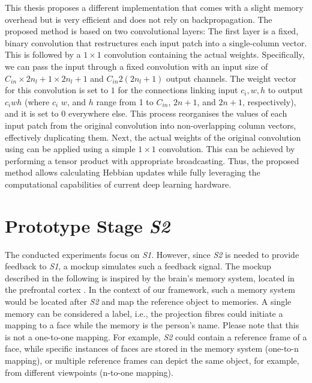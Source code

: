 This thesis proposes a different implementation that comes with a slight memory overhead but is very efficient and does not rely on backpropagation. The proposed method is based on two convolutional layers: The first layer is a fixed, binary convolution that restructures each input patch into a single-column vector. This is followed by a $1\times1$ convolution containing the actual weights. Specifically, we can pass the input through a fixed convolution with an input size of $C_{in} \times 2n_l+1 \times 2n_l+1$ and $C_{in} 2(2n_l+1)$ output channels. The weight vector for this convolution is set to $1$ for the connections linking input $c_i,w,h$ to output $c_iwh$ (where $c_i$ $w$, and $h$ range from 1 to $C_{in}$, $2n+1$, and $2n+1$, respectively), and it is set to 0 everywhere else. This process reorganises the values of each input patch from the original convolution into non-overlapping column vectors, effectively duplicating them. Next, the actual weights of the original convolution using can be applied using a simple $1\times1$ convolution. This can be achieved by performing a tensor product with appropriate broadcasting.
Thus, the proposed method allows calculating Hebbian updates while fully leveraging the computational capabilities of current deep learning hardware.







\section{Prototype Stage \emph{S2}}
The conducted experiments focus on \emph{S1}.
However, since \emph{S2} is needed to provide feedback to \emph{S1}, a mockup simulates such a feedback signal.
The mockup described in the following is inspired by the brain's memory system, located in the prefrontal cortex .
In the context of our framework, such a memory system would be located after \emph{S2} and map the reference object to memories.
A single memory can be considered a label, i.e., the projection fibres could initiate a mapping to a face while the memory is the person's name.
Please note that this is not a one-to-one mapping. For example, \emph{S2} could contain a reference frame of a face, while specific instances of faces are stored in the memory system (one-to-n mapping), or multiple reference frames can depict the same object, for example, from different viewpoints (n-to-one mapping).

